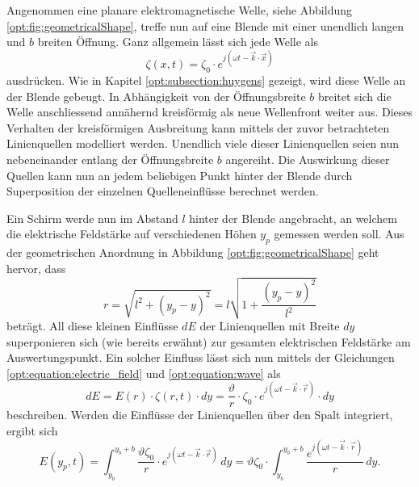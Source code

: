 Angenommen eine planare elektromagnetische Welle, siehe Abbildung \ref{opt:fig:geometricalShape}, treffe nun auf eine Blende mit einer unendlich langen und $b$ breiten Öffnung.
Ganz allgemein lässt sich jede Welle als
\begin{equation}
\zeta(x, t)
=
\zeta_0 \cdot e^{j(\omega t - \vec{k}\cdot\vec{x})}
\label{opt:equation:wave}
\end{equation}
ausdrücken.
Wie in Kapitel \ref{opt:subsection:huygens} gezeigt, wird diese Welle an der Blende gebeugt.
In Abhängigkeit von der Öffnungsbreite $b$ breitet sich die Welle anschliessend annähernd kreisförmig als neue Wellenfront weiter aus.
Dieses Verhalten der kreisförmigen Ausbreitung kann mittels der zuvor betrachteten Linienquellen modelliert werden.
Unendlich viele dieser Linienquellen seien nun nebeneinander entlang der Öffnungsbreite $b$ angereiht.
Die Auswirkung dieser Quellen kann nun an jedem beliebigen Punkt hinter der Blende durch Superposition der einzelnen Quelleneinflüsse berechnet werden.

Ein Schirm werde nun im Abstand $l$ hinter der Blende angebracht, an welchem die elektrische Feldstärke auf verschiedenen Höhen $y_p$ gemessen werden soll.
Aus der geometrischen Anordnung in Abbildung \ref{opt:fig:geometricalShape} geht hervor, dass
\begin{equation}
r
=
\sqrt{l^2 + (y_p-y)^2}
=
l \sqrt{1 + \frac{(y_p-y)^2}{l^2}}
\label{opt:equation:distance_r}
\end{equation}
beträgt. All diese kleinen Einflüsse $dE$ der Linienquellen mit Breite $dy$ superponieren sich (wie bereits erwähnt) zur gesamten elektrischen Feldstärke am Auswertungspunkt.
Ein solcher Einfluss lässt sich nun mittels der Gleichungen \eqref{opt:equation:electric_field} und \eqref{opt:equation:wave} als
\begin{equation*}
dE
=
E(r) \cdot \zeta(r, t) \cdot dy
=
\frac{\vartheta}{r} \cdot \zeta_0 \cdot e^{j(\omega t - \vec{k}\cdot\vec{r})} \cdot dy
\end{equation*}
beschreiben.
Werden die Einflüsse der Linienquellen über den Spalt integriert, ergibt sich
\begin{equation*}
E(y_p, t)
=
\int_{y_b}^{y_b+b}\frac{\vartheta\zeta_0}{r} \cdot e^{j(\omega t - \vec{k}\cdot\vec{r})} \,dy
=
\vartheta\zeta_0 \cdot \int_{y_b}^{y_b+b}\frac{e^{j(\omega t - \vec{k}\cdot\vec{r})}}{r} \,dy
.
\end{equation*}


